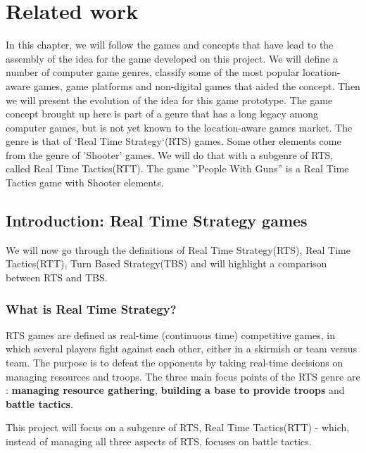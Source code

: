 
\section{Related work}

In this chapter, we will follow the games and concepts that have lead to the
assembly of the idea for the game developed on this project. We will define a
number of computer game genres, classify some of the most popular location-aware
games, game platforms and non-digital games that aided the concept. Then we will
present the evolution of the idea for this game prototype. The game concept
brought up here is part of a genre that has a long legacy among computer games,
but is not yet known to the location-aware games market. The genre is that of
`Real Time Strategy`(RTS)\cite{rts} games. Some other elements come from the
genre of 'Shooter' games\cite{shooter}. We will do that with a subgenre of RTS,
called Real Time Tactics(RTT)\cite{rttvsrts}. The game ''People With Guns'' is a
Real Time Tactics game with Shooter elements.\newline


\subsection{Introduction: Real Time Strategy games}

We will now go through the definitions of Real Time Strategy(RTS), Real Time
Tactics(RTT), Turn Based Strategy(TBS) and will highlight a comparison between
RTS and TBS.

\subsubsection{What is Real Time Strategy?}

RTS games are defined as real-time (continuous time) competitive games, in which
several players fight against each other, either in a skirmish or team versus
team\cite{rts2}. The purpose is to defeat the opponents by taking real-time
decisions on managing resources and troops\cite{rts3}\cite{rts4}. The three main
focus points of the RTS genre are : \textbf{managing resource gathering},
\textbf{building a base to provide troops} and \textbf{battle
tactics}.\cite{rts}\newline

This project will focus on a subgenre of RTS, Real Time Tactics(RTT) - which,
instead of managing all three aspects of RTS, focuses on battle
tactics\cite{rtt}.\newline

